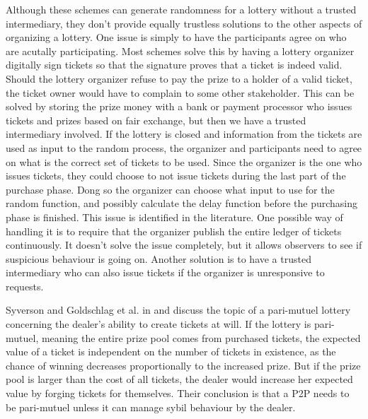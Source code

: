 Although these schemes can generate randomness for a lottery without a trusted intermediary, they don't provide equally trustless solutions to the other aspects of organizing a lottery. One issue is simply to have the participants agree on who are acutally participating. Most schemes solve this by having a lottery organizer digitally sign tickets so that the signature proves that a ticket is indeed valid. Should the lottery organizer refuse to pay the prize to a holder of a valid ticket, the ticket owner would have to complain to some other stakeholder. This can be solved by storing the prize money with a bank or payment processor who issues tickets and prizes based on fair exchange, but then we have a trusted intermediary involved. 
If the lottery is closed and information from the tickets are used as input to the random process, the organizer and participants need to agree on what is the correct set of tickets to be used. Since the organizer is the one who issues tickets, they could choose to not issue tickets during the last part of the purchase phase. Dong so the organizer can choose what input to use for the random function, and possibly calculate the delay function before the purchasing phase is finished. This issue is identified in the literature. One possible way of handling it is to require that the organizer publish the entire ledger of tickets continuously. It doesn't solve the issue completely, but it allows observers to see if suspicious behaviour is going on. Another solution is to have a trusted intermediary who can also issue tickets if the organizer is unresponsive to requests.

Syverson and Goldschlag et al. in \cite{syverson_weakly_1998} and \cite{goldschlag_temporarily_2010} discuss the topic of a pari-mutuel lottery concerning the dealer's ability to create tickets at will. If the lottery is pari-mutuel, meaning the entire prize pool comes from purchased tickets, the expected value of a ticket is independent on the number of tickets in existence, as the chance of winning decreases proportionally to the increased prize. But if the prize pool is larger than the cost of all tickets, the dealer would increase her expected value by forging tickets for themselves. Their conclusion is that a P2P needs to be pari-mutuel unless it can manage sybil behaviour by the dealer.

